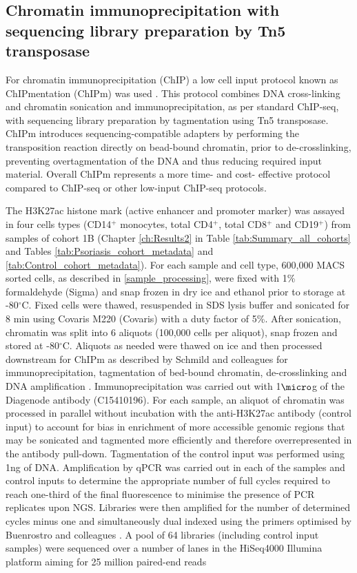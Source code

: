 \subsection{Chromatin immunoprecipitation with sequencing library preparation by Tn5 transposase}
For chromatin immunoprecipitation (ChIP) a low cell input protocol known as ChIPmentation (ChIPm) was used \parencite{Schmidl2015}. This protocol combines DNA cross-linking and chromatin sonication and immunoprecipitation, as per standard ChIP-seq, with sequencing library preparation by tagmentation using Tn5 transposase. ChIPm introduces sequencing-compatible adapters by performing the transposition reaction directly on bead-bound chromatin, prior to de-crosslinking, preventing overtagmentation of the DNA and thus reducing required input material. Overall ChIPm represents a more time- and cost- effective protocol compared to ChIP-seq or other low-input ChIP-seq protocols. 

The H3K27ac histone mark (active enhancer and promoter marker) was assayed in four cells types (CD14$^+$ monocytes, total CD4$^+$, total CD8$^+$ and CD19$^+$) from samples of cohort 1B (Chapter \ref{ch:Results2} in Table \ref{tab:Summary_all_cohorts} and Tables \ref{tab:Psoriasis_cohort_metadata} and \ref{tab:Control_cohort_metadata}). For each sample and cell type, 600,000 MACS sorted cells, as described in \ref{sample_processing}, were fixed with 1\% formaldehyde (Sigma) and snap frozen in dry ice and ethanol prior to storage at -80{$^\circ$}C. Fixed cells were thawed, resuspended in SDS lysis buffer and sonicated for 8 min using Covaris M220 (Covaris) with a duty factor of 5\%. After sonication, chromatin was split into 6 aliquots (100,000 cells per aliquot), snap frozen and stored at -80{$^\circ$}C. Aliquots as needed were thawed on ice and then processed downstream for ChIPm as described by Schmild and colleagues for immunoprecipitation, tagmentation of bed-bound chromatin, de-crosslinking and DNA amplification \parencite{Schmidl2015}. Immunoprecipitation was carried out with 1$\micro$g of the Diagenode antibody (C15410196). For each sample, an aliquot of chromatin was processed in parallel without incubation with the anti-H3K27ac antibody (control input) to account for bias in enrichment of more accessible genomic regions that may be sonicated and tagmented more efficiently and therefore overrepresented in the antibody pull-down. Tagmentation of the control input was performed using 1ng of DNA. Amplification by qPCR was carried out in each of the samples and control inputs to determine the appropriate number of full cycles required to reach one-third of the final fluorescence to minimise the presence of PCR replicates upon NGS. Libraries were then amplified for the number of determined cycles minus one and simultaneously dual indexed using the primers optimised by Buenrostro and colleagues \parencite{Buenrostro2015}. A pool of 64 libraries (including control input samples) were sequenced over a number of lanes in the HiSeq4000 Illumina platform aiming for 25 million paired-end reads



